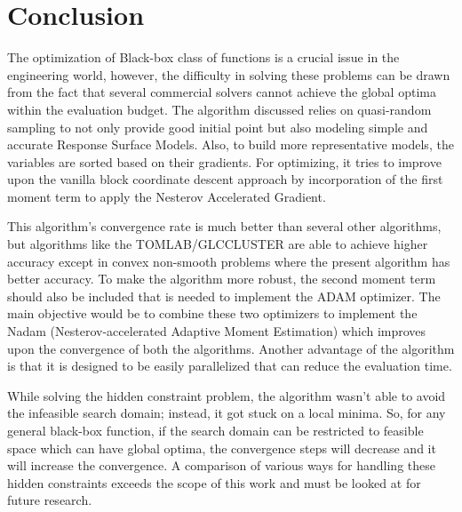 \chapter{Conclusion}
The optimization of Black-box class of functions is a crucial issue in the engineering world, however, the difficulty in solving these problems can be drawn from the fact that several commercial solvers cannot achieve the global optima within the evaluation budget. The algorithm discussed relies on quasi-random sampling to not only provide good initial point but also modeling simple and accurate Response Surface Models. Also, to build more representative models, the variables are sorted based on their gradients. For optimizing, it tries to improve upon the vanilla block coordinate descent approach by incorporation of the first moment term to apply the Nesterov Accelerated Gradient.

\bigskip
\noindent
This algorithm's convergence rate is much better than several other algorithms, but algorithms like the TOMLAB/GLCCLUSTER are able to achieve higher accuracy except in convex non-smooth problems where the present algorithm has better accuracy. To make the algorithm more robust, the second moment term should also be included that is needed to implement the ADAM optimizer. The main objective would be to combine these two optimizers to implement the Nadam (Nesterov-accelerated Adaptive Moment Estimation) \cite{ruder2016overview} which improves upon the convergence of both the algorithms. Another advantage of the algorithm is that it is designed to be easily parallelized that can reduce the evaluation time. 

\bigskip
\noindent
While solving the hidden constraint problem, the algorithm wasn't able to avoid the infeasible search domain; instead, it got stuck on a local minima. So, for any general black-box function, if the search domain can be restricted to feasible space which can have global optima, the convergence steps will decrease and it will increase the convergence. A comparison of various ways for handling these hidden constraints exceeds the scope of this work and must be looked at for future research.